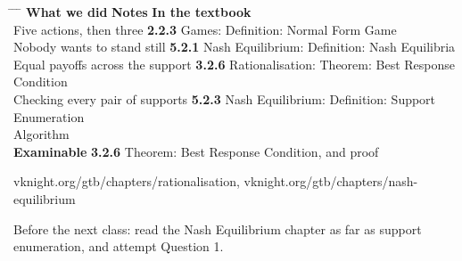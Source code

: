 \hspace{0.3cm}
\begin{minipage}{0.95\linewidth}
\begin{tabbing}
\hspace{6.9cm} \= \hspace{3.0cm} \= \hspace{9.4cm} \= \kill
\textbf{What we did} \> {\color{inkteal}\textbf{Notes}} \> \textbf{In the textbook} \>
  \\[0.5em]
Five actions, then three \> {\color{inkteal}\textbf{2.2.3}} \> Games: Definition:
  Normal Form Game \> \\[0.45em]
Nobody wants to stand still \> {\color{inkteal}\textbf{5.2.1}} \> Nash Equilibrium:
  Definition: Nash Equilibria \> \\[0.45em]
Equal payoffs across the support \> {\color{inkteal}\textbf{3.2.6}} \>
  Rationalisation: Theorem: Best Response Condition \> \\[0.45em]
Checking every pair of supports \> {\color{inkteal}\textbf{5.2.3}} \> Nash
  Equilibrium: Definition: Support Enumeration \> \\
\> \> Algorithm \> \\[0.45em]
\textbf{Examinable} \> {\color{inkteal}\textbf{3.2.6}} \> Theorem: Best Response
  Condition, and proof \> 
\end{tabbing}
\end{minipage}

\vspace{0.45cm}

{\color{inkgrey} vknight.org/gtb/chapters/rationalisation, \;
  vknight.org/gtb/chapters/nash-equilibrium}

\vspace{0.3cm}

{\large Before the next class: read the Nash Equilibrium chapter as far as support
  enumeration, and attempt Question 1.}


